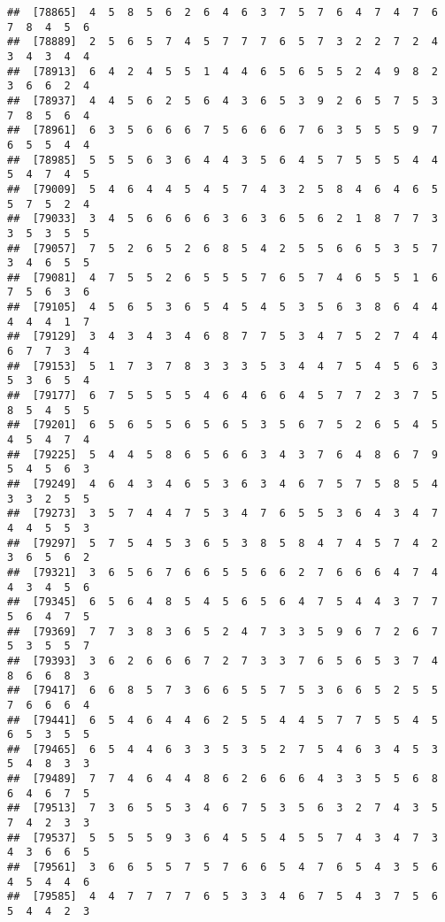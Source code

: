 \documentclass[
]{book}
\begin{document}
\begin{verbatim}
##  [78865]  4  5  8  5  6  2  6  4  6  3  7  5  7  6  4  7  4  7  6  7  8  4  5  6
##  [78889]  2  5  6  5  7  4  5  7  7  7  6  5  7  3  2  2  7  2  4  3  4  3  4  4
##  [78913]  6  4  2  4  5  5  1  4  4  6  5  6  5  5  2  4  9  8  2  3  6  6  2  4
##  [78937]  4  4  5  6  2  5  6  4  3  6  5  3  9  2  6  5  7  5  3  7  8  5  6  4
##  [78961]  6  3  5  6  6  6  7  5  6  6  6  7  6  3  5  5  5  9  7  6  5  5  4  4
##  [78985]  5  5  5  6  3  6  4  4  3  5  6  4  5  7  5  5  5  4  4  5  4  7  4  5
##  [79009]  5  4  6  4  4  5  4  5  7  4  3  2  5  8  4  6  4  6  5  5  7  5  2  4
##  [79033]  3  4  5  6  6  6  6  3  6  3  6  5  6  2  1  8  7  7  3  3  5  3  5  5
##  [79057]  7  5  2  6  5  2  6  8  5  4  2  5  5  6  6  5  3  5  7  3  4  6  5  5
##  [79081]  4  7  5  5  2  6  5  5  5  7  6  5  7  4  6  5  5  1  6  7  5  6  3  6
##  [79105]  4  5  6  5  3  6  5  4  5  4  5  3  5  6  3  8  6  4  4  4  4  4  1  7
##  [79129]  3  4  3  4  3  4  6  8  7  7  5  3  4  7  5  2  7  4  4  6  7  7  3  4
##  [79153]  5  1  7  3  7  8  3  3  3  5  3  4  4  7  5  4  5  6  3  5  3  6  5  4
##  [79177]  6  7  5  5  5  5  4  6  4  6  6  4  5  7  7  2  3  7  5  8  5  4  5  5
##  [79201]  6  5  6  5  5  6  5  6  5  3  5  6  7  5  2  6  5  4  5  4  5  4  7  4
##  [79225]  5  4  4  5  8  6  5  6  6  3  4  3  7  6  4  8  6  7  9  5  4  5  6  3
##  [79249]  4  6  4  3  4  6  5  3  6  3  4  6  7  5  7  5  8  5  4  3  3  2  5  5
##  [79273]  3  5  7  4  4  7  5  3  4  7  6  5  5  3  6  4  3  4  7  4  4  5  5  3
##  [79297]  5  7  5  4  5  3  6  5  3  8  5  8  4  7  4  5  7  4  2  3  6  5  6  2
##  [79321]  3  6  5  6  7  6  6  5  5  6  6  2  7  6  6  6  4  7  4  4  3  4  5  6
##  [79345]  6  5  6  4  8  5  4  5  6  5  6  4  7  5  4  4  3  7  7  5  6  4  7  5
##  [79369]  7  7  3  8  3  6  5  2  4  7  3  3  5  9  6  7  2  6  7  5  3  5  5  7
##  [79393]  3  6  2  6  6  6  7  2  7  3  3  7  6  5  6  5  3  7  4  8  6  6  8  3
##  [79417]  6  6  8  5  7  3  6  6  5  5  7  5  3  6  6  5  2  5  5  7  6  6  6  4
##  [79441]  6  5  4  6  4  4  6  2  5  5  4  4  5  7  7  5  5  4  5  6  5  3  5  5
##  [79465]  6  5  4  4  6  3  3  5  3  5  2  7  5  4  6  3  4  5  3  5  4  8  3  3
##  [79489]  7  7  4  6  4  4  8  6  2  6  6  6  4  3  3  5  5  6  8  6  4  6  7  5
##  [79513]  7  3  6  5  5  3  4  6  7  5  3  5  6  3  2  7  4  3  5  7  4  2  3  3
##  [79537]  5  5  5  5  9  3  6  4  5  5  4  5  5  7  4  3  4  7  3  4  3  6  6  5
##  [79561]  3  6  6  5  5  7  5  7  6  6  5  4  7  6  5  4  3  5  6  4  5  4  4  6
##  [79585]  4  4  7  7  7  7  6  5  3  3  4  6  7  5  4  3  7  5  6  5  4  4  2  3

\end{verbatim}
\end{document}
